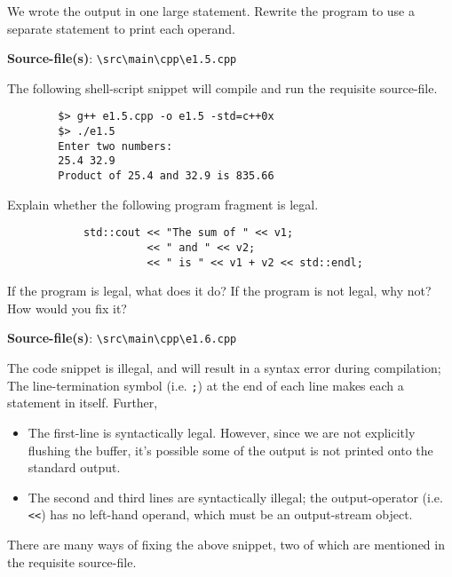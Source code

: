 \documentclass[12pt, a4paper]{article}
\begin{document}
    \bigskip
    \begin{tcolorbox}[title={Exercise: 1.5}]
        We wrote the output in one large statement.
        Rewrite the program to use a separate statement to print each operand.
    \end{tcolorbox}
    \noindent\textbf{Source-file(s)}: \texttt{\textbackslash src\textbackslash main\textbackslash cpp\textbackslash e1.5.cpp}

    \noindent The following shell-script snippet will compile and run the requisite source-file.
    \begin{verbatim}
        $> g++ e1.5.cpp -o e1.5 -std=c++0x
        $> ./e1.5
        Enter two numbers:
        25.4 32.9
        Product of 25.4 and 32.9 is 835.66
    \end{verbatim}

    \bigskip
    \begin{tcolorbox}[title={Exercise: 1.6}]
        Explain whether the following program fragment is legal.

        \begin{verbatim}
            std::cout << "The sum of " << v1;
                      << " and " << v2;
                      << " is " << v1 + v2 << std::endl;
        \end{verbatim}

        If the program is legal, what does it do?
        If the program is not legal, why not?
        How would you fix it?
    \end{tcolorbox}
    \noindent\textbf{Source-file(s)}: \texttt{\textbackslash src\textbackslash main\textbackslash cpp\textbackslash e1.6.cpp}

    \noindent The code snippet is illegal, and will result in a syntax error during compilation;
    The line-termination symbol (i.e. \texttt{;}) at the end of each line makes each a statement in itself.
    Further,
    \begin{itemize}
        \item {The first-line is syntactically legal. However, since we are not explicitly flushing the buffer, it's possible some of the output is not printed onto the standard output.}
        \item {The second and third lines are syntactically illegal; the output-operator (i.e. \texttt{<<}) has no left-hand operand, which must be an output-stream object.}
    \end{itemize}

    \noindent There are many ways of fixing the above snippet, two of which are mentioned in the requisite source-file.
\end{document}
